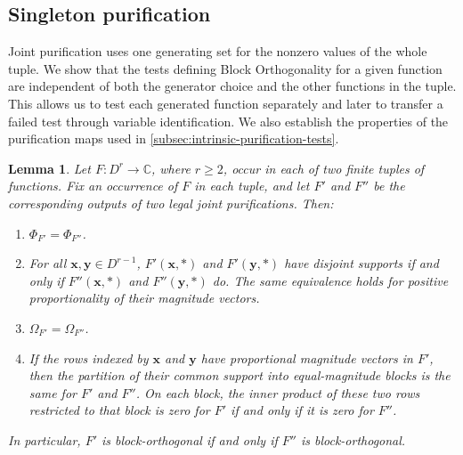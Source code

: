 \documentclass[11pt,letterpaper,onecolumn]{article}
\theoremstyle{plain}
\newtheorem{lemma}[lemma]{Lemma}
\theoremstyle{definition}
\theoremstyle{remark}
\newcommand{\AlgNums}{\mathbb C}
\newcommand{\SuppRel}[1]{\Phi_{#1}}
\newcommand{\RowEq}[1]{\Omega_{#1}}
\begin{document}
\subsection{Singleton purification}

Joint purification uses one generating set for the nonzero values of the
whole tuple.
We show that the tests defining Block Orthogonality for a given function
are independent of both the generator choice and the other functions in
the tuple.  This allows us to test each generated function separately and
later to transfer a failed test through variable identification.
We also establish the properties of the purification maps used in
\cref{subsec:intrinsic-purification-tests}.

\begin{lemma}
\label{lem:purification-invariance}
Let $F:D^r\to\AlgNums$, where $r\ge2$, occur in each of two finite
tuples of functions.  Fix an occurrence of $F$ in each tuple, and let
$F'$ and $F''$ be the corresponding outputs of two legal joint
purifications.  Then:
\begin{enumerate}
  \item\label{item:purification-support}
        $\SuppRel{F'}=\SuppRel{F''}$.
  \item\label{item:purification-magnitudes}
        For all $\mathbf x,\mathbf y\in D^{r-1}$,
        $F'(\mathbf x,\ast)$ and $F'(\mathbf y,\ast)$ have disjoint
        supports if and only if $F''(\mathbf x,\ast)$ and
        $F''(\mathbf y,\ast)$ do.  The same equivalence holds for
        positive proportionality of their magnitude vectors.
  \item\label{item:purification-row-equivalence}
        $\RowEq{F'}=\RowEq{F''}$.
  \item\label{item:purification-block-sums}
        If the rows indexed by $\mathbf x$ and $\mathbf y$ have
        proportional magnitude vectors in $F'$, then the partition of
        their common support into equal-magnitude blocks is the same for
        $F'$ and $F''$.  On each block, the inner product of these two
        rows restricted to that block is zero for $F'$ if and only if
        it is zero for $F''$.
\end{enumerate}
In particular, $F'$ is block-orthogonal if and only if $F''$ is
block-orthogonal.


\end{lemma}
\end{document}
